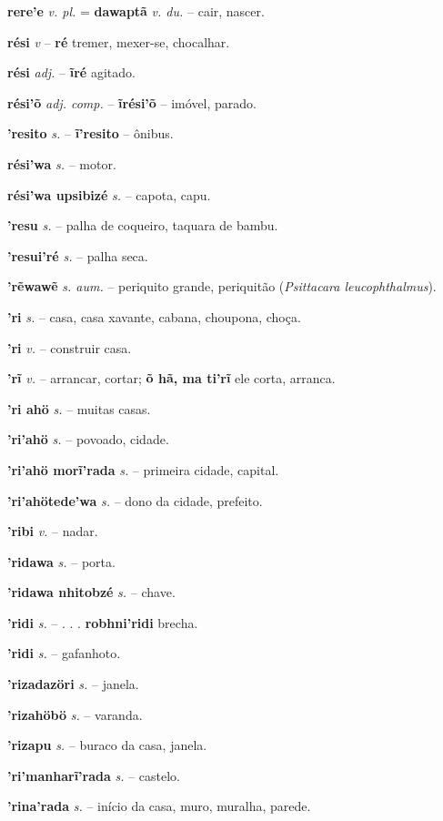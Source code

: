 \textbf{rere'e} \textit{v. pl.} = \textbf{dawaptã} \textit{v. du.} -- cair, nascer.

\textbf{rési} \textit{v} -- \textbf{ré} tremer, mexer-se, chocalhar.

\textbf{rési} \textit{adj.} -- \textbf{ĩré} agitado.

\textbf{rési'õ} \textit{adj. comp.} -- \textbf{ĩrési'õ} -- imóvel, parado.

\textbf{'resito} \textit{s.} -- \textbf{ĩ'resito} -- ônibus.

\textbf{rési'wa} \textit{s.} -- motor.

\textbf{rési'wa upsibizé} \textit{s.} -- capota, capu.

\textbf{'resu} \textit{s.} -- palha de coqueiro, taquara de bambu.

\textbf{'resui'ré} \textit{s.} -- palha seca.

\textbf{'rẽwawẽ} \textit{s. aum.} -- periquito grande, periquitão (\textit{Psittacara leucophthalmus}).

\textbf{'ri} \textit{s.} -- casa, casa xavante, cabana, choupona, choça.

\textbf{'ri} \textit{v.} -- construir casa.

\textbf{'rĩ} \textit{v.} -- arrancar, cortar; \textbf{õ hã, ma ti'rĩ} ele corta, arranca.

\textbf{'ri ahö} \textit{s.} -- muitas casas.

\textbf{'ri'ahö} \textit{s.} -- povoado, cidade.

\textbf{'ri'ahö morĩ'rada} \textit{s.} -- primeira cidade, capital.

\textbf{'ri'ahötede'wa} \textit{s.} -- dono da cidade, prefeito.

\textbf{'ribi} \textit{v.} -- nadar.

\textbf{'ridawa} \textit{s.} -- porta.

\textbf{'ridawa nhitobzé} \textit{s.} -- chave.

\textbf{'ridi} \textit{s.} -- . . . \textbf{robhni'ridi} brecha.

\textbf{'ridi} \textit{s.} -- gafanhoto.

\textbf{'rizadazöri} \textit{s.} -- janela.

\textbf{'rizahöbö} \textit{s.} -- varanda.

\textbf{'rizapu} \textit{s.} -- buraco da casa, janela.

\textbf{'ri'manharĩ'rada} \textit{s.} -- castelo.

\textbf{'rina'rada} \textit{s.} -- início da casa, muro, muralha, parede.

